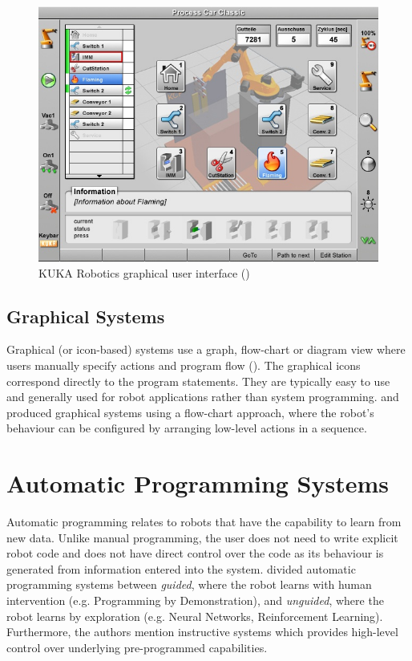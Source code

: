 \begin{figure}[h]
	\centering
	\includegraphics[width=0.8\linewidth]{figures/kuka.jpg}
	\caption{KUKA Robotics graphical user interface (\cite{kuka2006})}
	\label{fig:Kuka}
\end{figure} 


\subsection{Graphical Systems}\label{sssec:Graphical systems}
Graphical (or icon-based) systems use a graph, flow-chart or diagram view where users manually specify actions and program flow ().
The graphical icons correspond directly to the program statements.
They are typically easy to use and generally used for robot applications rather than system programming. 
\cite{lego2003} and \cite{bischoff2002morpha} produced graphical systems using a flow-chart approach, where the robot's behaviour can be configured by arranging low-level actions in a sequence.


\section{Automatic Programming Systems}\label{subsec:Automatic Programming Systems}
Automatic programming relates to robots that have the capability to learn from new data.
Unlike manual programming, the user does not need to write explicit robot code and does not have direct control over the code as its behaviour is generated from information entered into the system.
\cite{Biggs2003} divided automatic programming systems between \textit{guided}, where the robot learns with human intervention (e.g. Programming by Demonstration), and \textit{unguided}, where the robot learns by exploration (e.g. Neural Networks, Reinforcement Learning).
Furthermore, the authors mention instructive systems which provides high-level control over underlying pre-programmed capabilities.

